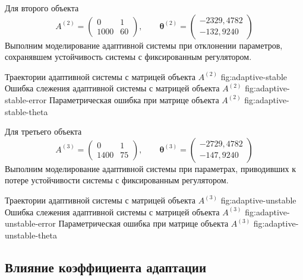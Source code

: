 Для второго объекта
\begin{equation}
  A^{(2)}=\begin{pmatrix}0&1\\1000&60\end{pmatrix},
  \qquad
  \bm\theta^{(2)}=\begin{pmatrix}-2329{,}4782\\-132{,}9240\end{pmatrix}
\end{equation}
Выполним моделирование адаптивной системы при отклонении параметров,
сохранявшем устойчивость системы с фиксированным регулятором.

  {Траектории адаптивной системы с матрицей объекта $A^{(2)}$}
  {fig:adaptive-stable}
  {Ошибка слежения адаптивной системы с матрицей объекта $A^{(2)}$}
  {fig:adaptive-stable-error}
  {Параметрическая ошибка при матрице объекта $A^{(2)}$}
  {fig:adaptive-stable-theta}

Для третьего объекта
\begin{equation}
  A^{(3)}=\begin{pmatrix}0&1\\1400&75\end{pmatrix},
  \qquad
  \bm\theta^{(3)}=\begin{pmatrix}-2729{,}4782\\-147{,}9240\end{pmatrix}
\end{equation}
Выполним моделирование адаптивной системы при параметрах,
приводивших к потере устойчивости системы с фиксированным регулятором.

  {Траектории адаптивной системы с матрицей объекта $A^{(3)}$}
  {fig:adaptive-unstable}
  {Ошибка слежения адаптивной системы с матрицей объекта $A^{(3)}$}
  {fig:adaptive-unstable-error}
  {Параметрическая ошибка при матрице объекта $A^{(3)}$}
  {fig:adaptive-unstable-theta}

\subsection{Влияние коэффициента адаптации}

